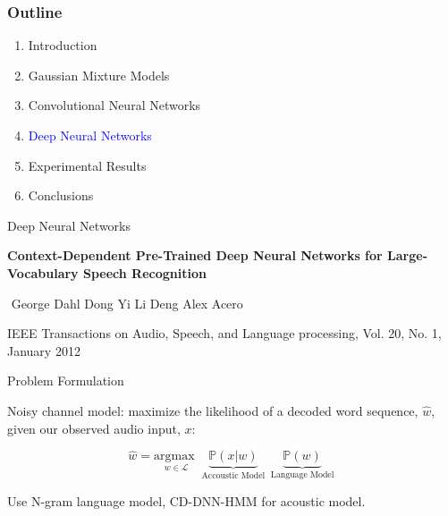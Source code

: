 \documentclass[notes]{beamer}
\newcommand{\argmax}[1]{\underset{#1}{\text{argmax }}}
\newcommand{\cprob}[2]{ \prob{#1 \lvert #2} }
\newcommand{\prob}[1]{\mathbb{P}\left( #1 \right)}
\begin{document}
\begin{frame}
	\frametitle{Outline}
	
	\begin{enumerate}
		\item Introduction
		\item Gaussian Mixture Models
		\item Convolutional Neural Networks
		\item \textcolor{blue}{Deep Neural Networks}
		\item Experimental Results
		\item Conclusions
	\end{enumerate}
\end{frame}

\begin{frame}{Deep Neural Networks}
	\begin{center}
	\textbf{Context-Dependent Pre-Trained Deep Neural Networks for Large-Vocabulary Speech Recognition}
	\end{center}
	
	\vfill

	 $ $ \hfill George Dahl \hfill Dong Yi \hfill Li Deng \hfill Alex Acero \hfill  $ $
	
	\vfill
	
	\begin{center}
		IEEE Transactions on Audio, Speech, and Language processing, Vol. 20, No. 1, January 2012
	\end{center}
	
\end{frame}
	
\begin{frame}{Problem Formulation}
	\begin{center}
		Noisy channel model: maximize the likelihood of a decoded word sequence, $\hat{w}$, given our observed audio input, $x$:
	\end{center}
	 
	\vfill
	
	\begin{equation*}
		\hat{w} = \argmax{w \in \mathscr{L}} \underbrace{\cprob{x}{w}}_{\text{ Accoustic Model }} \underbrace{\prob{w}}_{\text{ Language Model }} 
	\end{equation*}
	
	\vfill
	
	\begin{center}
		Use N-gram language model, CD-DNN-HMM for acoustic model.
	\end{center}
\end{frame}
\end{document}
